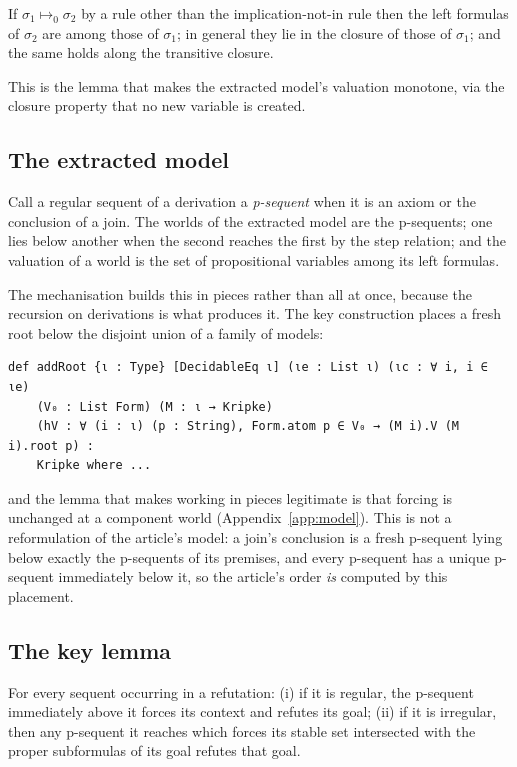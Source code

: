 \documentclass[11pt,a4paper]{article}
\begin{document}
\begin{lemma}[Lemma 3.5]
\label{lem:lhs}
If $\sigma_1 \mapsto_0 \sigma_2$ by a rule other than the
implication-not-in rule then the left formulas of $\sigma_2$ are among
those of $\sigma_1$; in general they lie in the closure of those of
$\sigma_1$; and the same holds along the transitive closure.
\end{lemma}

This is the lemma that makes the extracted model's valuation monotone, via
the closure property that no new variable is created.

\subsection{The extracted model}

Call a regular sequent of a derivation a \emph{p-sequent} when it is an
axiom or the conclusion of a join. The worlds of the extracted model are
the p-sequents; one lies below another when the second reaches the first
by the step relation; and the valuation of a world is the set of
propositional variables among its left formulas.

The mechanisation builds this in pieces rather than all at once, because
the recursion on derivations is what produces it. The key construction
places a fresh root below the disjoint union of a family of models:

\begin{lstlisting}
def addRoot {ι : Type} [DecidableEq ι] (ιe : List ι) (ιc : ∀ i, i ∈ ιe)
    (V₀ : List Form) (M : ι → Kripke)
    (hV : ∀ (i : ι) (p : String), Form.atom p ∈ V₀ → (M i).V (M i).root p) :
    Kripke where ...
\end{lstlisting}

\noindent
and the lemma that makes working in pieces legitimate is that forcing is
unchanged at a component world (Appendix~\ref{app:model}). This is not a
reformulation of the article's model: a join's conclusion is a fresh
p-sequent lying below exactly the p-sequents of its premises, and every
p-sequent has a unique p-sequent immediately below it, so the article's
order \emph{is} computed by this placement.

\subsection{The key lemma}

\begin{lemma}[Lemma 3.10]
\label{lem:key}
For every sequent occurring in a refutation:
(i) if it is regular, the p-sequent immediately above it forces its
context and refutes its goal;
(ii) if it is irregular, then any p-sequent it reaches which forces its
stable set intersected with the proper subformulas of its goal refutes
that goal.
\end{lemma}
\end{document}
